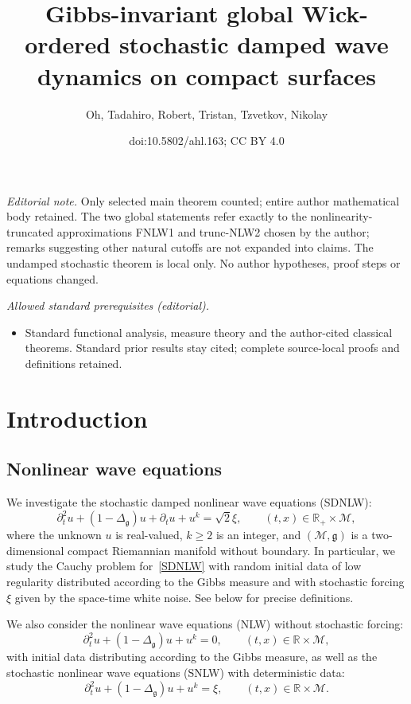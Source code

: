 \documentclass[10pt]{amsart}
\title{Gibbs-invariant global Wick-ordered stochastic damped wave dynamics on compact surfaces}
\author{Oh, Tadahiro, Robert, Tristan, Tzvetkov, Nikolay}
\date{doi:10.5802/ahl.163; CC BY 4.0}
\theoremstyle{definition}\newtheorem{defi}[theo]{Definition}\newtheorem{rema}[theo]{Remark}\newtheorem{exam}[theo]{Example}\newtheorem{exem}[theo]{Example}\newtheorem{nota}[theo]{Notation}
\newcommand{\R}{\mathbb{R}}
\newcommand{\M}{\mathcal{M}}
\newcommand{\g}{\mathfrak{g}}
\newcommand{\Dlg}{\Delta_{\g}}
\newcommand{\dt}{\partial_t}
\begin{document}
\maketitle
\noindent\textit{Editorial note.} Only selected main theorem counted; entire author mathematical body retained. The two global statements refer exactly to the nonlinearity-truncated approximations FNLW1 and trunc-NLW2 chosen by the author; remarks suggesting other natural cutoffs are not expanded into claims. The undamped stochastic theorem is local only. No author hypotheses, proof steps or equations changed.\par\medskip
\noindent\textit{Allowed standard prerequisites (editorial).}\begin{itemize}
\item Standard functional analysis, measure theory and the author-cited classical theorems. Standard prior results stay cited; complete source-local proofs and definitions retained.
\end{itemize}\medskip

\section{Introduction}

\subsection{Nonlinear wave equations}
We investigate the stochastic damped nonlinear wave equations (SDNLW):
\begin{equation}\label{SDNLW}
\dt^2 u + (1 - \Dlg) u + \dt u + u^k = \sqrt{2}\xi,
\qquad (t,x) \in \R_+ \times \M,
\end{equation}
where the unknown $u$ is real-valued, $k \geq 2$ is an integer, and $(\M,\g)$ is a two-dimensional compact Riemannian manifold without boundary. In particular, we study the Cauchy problem for~\eqref{SDNLW} with random initial data of low regularity distributed according to the Gibbs measure and with stochastic forcing $\xi$ given by the space-time white noise. See below for precise definitions.

We also consider the nonlinear wave equations (NLW) without stochastic forcing:
\begin{equation}\label{NLW}
\dt^2 u + (1 - \Dlg) u + u^k = 0,
\qquad (t,x) \in \R \times \M,
\end{equation}
with initial data distributing according to the Gibbs measure, as well as the stochastic nonlinear wave equations (SNLW) with deterministic data:
\begin{equation}\label{SNLW}
\dt^2 u + (1 - \Dlg) u + u^k = \xi,
\qquad (t,x) \in \R \times \M.
\end{equation}
\end{document}
